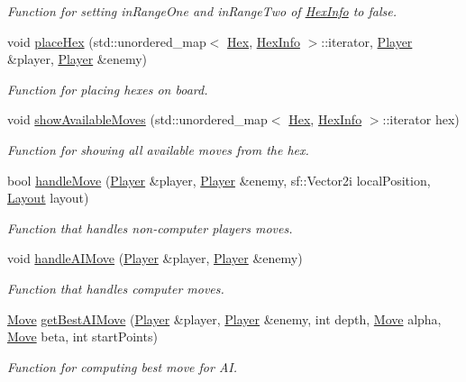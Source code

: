 \begin{DoxyCompactItemize}
\begin{DoxyCompactList}\small\item\em Function for setting in\+Range\+One and in\+Range\+Two of \hyperlink{structHexInfo}{Hex\+Info} to false. \end{DoxyCompactList}\item 
void \hyperlink{classBoard_a5b804121f1c23cfda1589e635e39859a}{place\+Hex} (std\+::unordered\+\_\+map$<$ \hyperlink{classHex}{Hex}, \hyperlink{structHexInfo}{Hex\+Info} $>$\+::iterator, \hyperlink{classPlayer}{Player} \&player, \hyperlink{classPlayer}{Player} \&enemy)
\begin{DoxyCompactList}\small\item\em Function for placing hexes on board. \end{DoxyCompactList}\item 
void \hyperlink{classBoard_a6ed22f5f63b783b5b9143a1cf0f8774a}{show\+Available\+Moves} (std\+::unordered\+\_\+map$<$ \hyperlink{classHex}{Hex}, \hyperlink{structHexInfo}{Hex\+Info} $>$\+::iterator hex)
\begin{DoxyCompactList}\small\item\em Function for showing all available moves from the hex. \end{DoxyCompactList}\item 
bool \hyperlink{classBoard_ab095bf01db0c960d28f1578ccc27c7d8}{handle\+Move} (\hyperlink{classPlayer}{Player} \&player, \hyperlink{classPlayer}{Player} \&enemy, sf\+::\+Vector2i local\+Position, \hyperlink{structLayout}{Layout} layout)
\begin{DoxyCompactList}\small\item\em Function that handles non-\/computer players moves. \end{DoxyCompactList}\item 
void \hyperlink{classBoard_ab755c50ccc50bfa48b919547a3bb5473}{handle\+A\+I\+Move} (\hyperlink{classPlayer}{Player} \&player, \hyperlink{classPlayer}{Player} \&enemy)
\begin{DoxyCompactList}\small\item\em Function that handles computer moves. \end{DoxyCompactList}\item 
\hyperlink{structMove}{Move} \hyperlink{classBoard_a11905c8542a1d76a77e9cb2d1185fa7f}{get\+Best\+A\+I\+Move} (\hyperlink{classPlayer}{Player} \&player, \hyperlink{classPlayer}{Player} \&enemy, int depth, \hyperlink{structMove}{Move} alpha, \hyperlink{structMove}{Move} beta, int start\+Points)
\begin{DoxyCompactList}\small\item\em Function for computing best move for AI. \end{DoxyCompactList}\item 

\end{DoxyCompactItemize}

